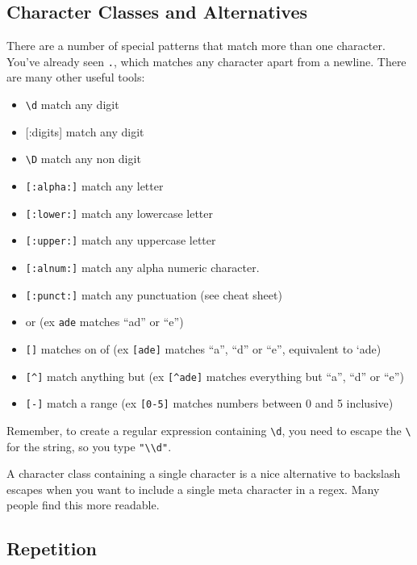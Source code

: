 \documentclass[]{book}
\providecommand{\tightlist}{%
  \setlength{\itemsep}{0pt}\setlength{\parskip}{0pt}}
\theoremstyle{definition}
\theoremstyle{definition}
\theoremstyle{definition}
\theoremstyle{remark}
\let\BeginKnitrBlock\begin \let\EndKnitrBlock\end
\begin{document}
\subsection{Character Classes and
Alternatives}\label{character-classes-and-alternatives}

There are a number of special patterns that match more than one
character. You've already seen \texttt{.}, which matches any character
apart from a newline. There are many other useful tools:

\begin{itemize}
\tightlist
\item
  \texttt{\textbackslash{}d} match any digit
\item
  {[}:digits{]} match any digit
\item
  \texttt{\textbackslash{}D} match any non digit
\item
  \texttt{{[}:alpha:{]}} match any letter
\item
  \texttt{{[}:lower:{]}} match any lowercase letter
\item
  \texttt{{[}:upper:{]}} match any uppercase letter
\item
  \texttt{{[}:alnum:{]}} match any alpha numeric character.
\item
  \texttt{{[}:punct:{]}} match any punctuation (see cheat sheet)
\item
  \texttt{\textbar{}} or (ex \texttt{ad\textbar{}e} matches ``ad'' or
  ``e'')
\item
  \texttt{{[}{]}} matches on of (ex \texttt{{[}ade{]}} matches ``a'',
  ``d'' or ``e'', equivalent to `a\textbar{}d\textbar{}e)
\item
  \texttt{{[}\^{}{]}} match anything but (ex \texttt{{[}\^{}ade{]}}
  matches everything but ``a'', ``d'' or ``e'')
\item
  \texttt{{[}-{]}} match a range (ex \texttt{{[}0-5{]}} matches numbers
  between 0 and 5 inclusive)
\end{itemize}

\BeginKnitrBlock{rmdimportant}
Remember, to create a regular expression containing
\texttt{\textbackslash{}d}, you need to escape the
\texttt{\textbackslash{}} for the string, so you type
\texttt{"\textbackslash{}\textbackslash{}d"}.
\EndKnitrBlock{rmdimportant}

A character class containing a single character is a nice alternative to
backslash escapes when you want to include a single meta character in a
regex. Many people find this more readable.

\subsection{Repetition}\label{repetition}
\end{document}
